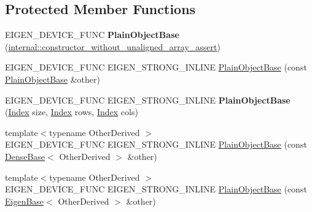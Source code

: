 \subsection*{Protected Member Functions}
\begin{DoxyCompactItemize}
\item 
\mbox{\label{class_eigen_1_1_plain_object_base_a0858f386df98336ff3e4e6dc5ce5fc8d}} 
E\+I\+G\+E\+N\+\_\+\+D\+E\+V\+I\+C\+E\+\_\+\+F\+U\+NC {\bfseries Plain\+Object\+Base} (\hyperlink{struct_eigen_1_1internal_1_1constructor__without__unaligned__array__assert}{internal\+::constructor\+\_\+without\+\_\+unaligned\+\_\+array\+\_\+assert})
\item 
E\+I\+G\+E\+N\+\_\+\+D\+E\+V\+I\+C\+E\+\_\+\+F\+U\+NC E\+I\+G\+E\+N\+\_\+\+S\+T\+R\+O\+N\+G\+\_\+\+I\+N\+L\+I\+NE \hyperlink{class_eigen_1_1_plain_object_base_a69656a28768b9b6f8b283e251d3552be}{Plain\+Object\+Base} (const \hyperlink{class_eigen_1_1_plain_object_base}{Plain\+Object\+Base} \&other)
\item 
\mbox{\label{class_eigen_1_1_plain_object_base_a1fd2d65d4f3b0a5231e84a2093c5f4f6}} 
E\+I\+G\+E\+N\+\_\+\+D\+E\+V\+I\+C\+E\+\_\+\+F\+U\+NC E\+I\+G\+E\+N\+\_\+\+S\+T\+R\+O\+N\+G\+\_\+\+I\+N\+L\+I\+NE {\bfseries Plain\+Object\+Base} (\hyperlink{namespace_eigen_a62e77e0933482dafde8fe197d9a2cfde}{Index} size, \hyperlink{namespace_eigen_a62e77e0933482dafde8fe197d9a2cfde}{Index} rows, \hyperlink{namespace_eigen_a62e77e0933482dafde8fe197d9a2cfde}{Index} cols)
\item 
{\footnotesize template$<$typename Other\+Derived $>$ }\\E\+I\+G\+E\+N\+\_\+\+D\+E\+V\+I\+C\+E\+\_\+\+F\+U\+NC E\+I\+G\+E\+N\+\_\+\+S\+T\+R\+O\+N\+G\+\_\+\+I\+N\+L\+I\+NE \hyperlink{class_eigen_1_1_plain_object_base_a82cdb1b9d5c90c2002cb5086c03c29fa}{Plain\+Object\+Base} (const \hyperlink{group___core___module_class_eigen_1_1_dense_base}{Dense\+Base}$<$ Other\+Derived $>$ \&other)
\item 
{\footnotesize template$<$typename Other\+Derived $>$ }\\E\+I\+G\+E\+N\+\_\+\+D\+E\+V\+I\+C\+E\+\_\+\+F\+U\+NC E\+I\+G\+E\+N\+\_\+\+S\+T\+R\+O\+N\+G\+\_\+\+I\+N\+L\+I\+NE \hyperlink{class_eigen_1_1_plain_object_base_a31d65efdbeaf9c7693bf6ae204d788f2}{Plain\+Object\+Base} (const \hyperlink{group___core___module_struct_eigen_1_1_eigen_base}{Eigen\+Base}$<$ Other\+Derived $>$ \&other)

\end{DoxyCompactItemize}
